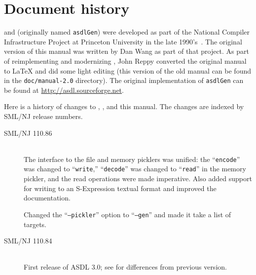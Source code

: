 %
\chapter{Document history}
\label{ch:history}

\asdl{} and \asdlgen{} (originally named \texttt{asdlGen}) were developed as part
of the National Compiler Infrastructure Project at Princeton University in the
late 1990's~\cite{usenix:zephyr-asdl}.
The original version of this manual was written by Dan Wang as part of that project.
As part of reimplementing and modernizing \asdl{}, John Reppy converted the original
manual to \LaTeX{} and did some light editing (this version of the old manual
can be found in the \texttt{doc/manual-2.0} directory).
The original implementation of \texttt{asdlGen} can be
found at \url{http://asdl.sourceforge.net}.

Here is a history of changes to \asdl{}, \asdlgen{}, and this manual.
The changes are indexed by SML/NJ release numbers.

\begin{description}
  \item[SML/NJ 110.86]
    \mbox{}\\[0.5em]
    The interface to the file and memory picklers was unified: the ``\texttt{encode}''
    was changed to ``\texttt{write},'' ``\texttt{decode}'' was changed to
    ``\texttt{read}'' in the memory pickler, and the read operations were made
    imperative.
    Also added support for writing to an S-Expression textual format and improved
    the documentation.

    Changed the ``\texttt{--pickler}'' option to ``\texttt{--gen}'' and made it take
    a list of targets.

  \item[SML/NJ 110.84]
    \mbox{}\\[0.5em]
    First release of ASDL 3.0; see  for differences from previous
    version.
\end{description}%
